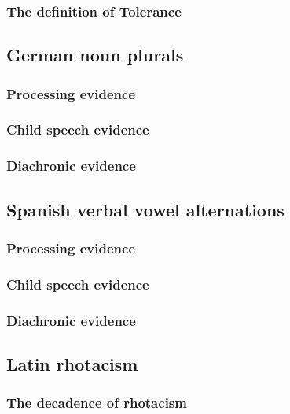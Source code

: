\documentclass{upenndiss}
\begin{document}
\subsubsection{The definition of Tolerance}

\subsection{German noun plurals}

\subsubsection{Processing evidence}

\subsubsection{Child speech evidence}

\subsubsection{Diachronic evidence}

\subsection{Spanish verbal vowel alternations}

\subsubsection{Processing evidence}

\subsubsection{Child speech evidence}

\subsubsection{Diachronic evidence}

\subsection{Latin rhotacism}

\subsubsection{The decadence of rhotacism}
\end{document}
